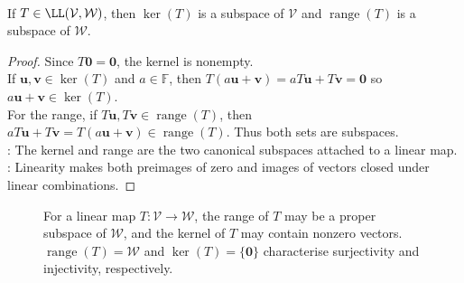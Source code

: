 \begin{proposition} \label{prop:kernel-and-range-are-subspaces} \\
If $T \in \LL(\mathcal{V}, \mathcal{W})$, then $\ker(T)$ is a subspace of $\mathcal{V}$ and $\operatorname{range}(T)$ is a subspace of $\mathcal{W}$.
\begin{proof}
Since $T\mathbf{0}=\mathbf{0}$, the kernel is nonempty.\\
If $\mathbf{u},\mathbf{v}\in\ker(T)$ and $a\in\mathbb{F}$, then $T(a\mathbf{u}+\mathbf{v})=aT\mathbf{u}+T\mathbf{v}=\mathbf{0}$ so $a\mathbf{u}+\mathbf{v}\in\ker(T)$.\\
For the range, if $T\mathbf{u},T\mathbf{v}\in\operatorname{range}(T)$, then $aT\mathbf{u}+T\mathbf{v}=T(a\mathbf{u}+\mathbf{v})\in\operatorname{range}(T)$.
Thus both sets are subspaces.\\
: The kernel and range are the two canonical subspaces attached to a linear map.\\
: Linearity makes both preimages of zero and images of vectors closed under linear combinations.
\end{proof}
\end{proposition}

\begin{figure}[H]
\centering
\scalebox{0.75}{}
\caption{For a linear map $T:\mathcal{V}\to\mathcal{W}$, the range of $T$ may be a proper subspace of $\mathcal{W}$, and the kernel of $T$ may contain nonzero vectors. $\operatorname{range}(T)=\mathcal{W}$ and $\ker(T)=\{\mathbf{0}\}$ characterise surjectivity and injectivity, respectively.}
\label{fig:kernel-range-linear-map}
\end{figure}

